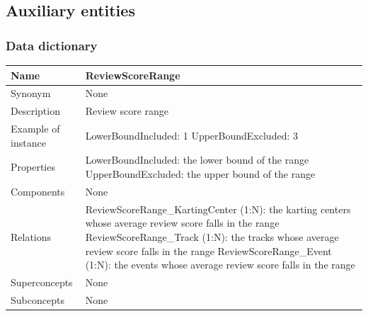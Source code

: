\documentclass{beamer}
\begin{document}
\subsection*{Auxiliary entities}

\begin{frame}
    \frametitle{Data dictionary}
    \begin{table}
    \tiny
    \begin{tabular}{|p{2cm}|p{6cm}|}
    \hline
    Name & \textbf{ReviewScoreRange} \\
    \hline
    Synonym & None \\
    \hline
    Description & Review score range \\
    \hline
    Example of instance &
    LowerBoundIncluded: 1 \newline
    UpperBoundExcluded: 3 \\
    \hline
    Properties &
    LowerBoundIncluded: the lower bound of the range \newline
    UpperBoundExcluded: the upper bound of the range \\
    \hline
    Components & None \\
    \hline
    Relations &
    ReviewScoreRange\_KartingCenter (1:N): the karting centers whose average review score falls in the range \newline
    ReviewScoreRange\_Track (1:N): the tracks whose average review score falls in the range \newline
    ReviewScoreRange\_Event (1:N): the events whose average review score falls in the range \\
    \hline
    Superconcepts & None \\
    \hline
    Subconcepts & None \\
    \hline
    \end{tabular}
    \end{table}
\end{frame}
\end{document}
